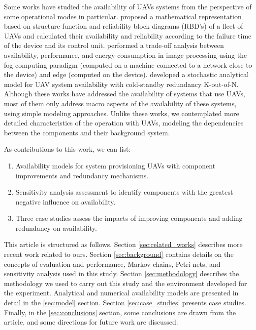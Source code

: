 \documentclass[conference]{IEEEtran}
\begin{document}
Some works have studied the availability of UAVs systems from the perspective of some operational modes in particular. \citet{Zaitseva2020, rusnak2019reliability} proposed a mathematical representation based on structure function and reliability block diagrams (RBD's) of a fleet of UAVs and calculated their availability and reliability according to the failure time of the device and its control unit. \citet{Machida2021, Report} performed a trade-off analysis between availability, performance, and energy consumption in image processing using the fog computing paradigm (computed on a machine connected to a network close to the device) and edge (computed on the device). \citet{Maccarthy2019} developed a stochastic analytical model for UAV system availability with cold-standby redundancy K-out-of-N. Although these works have addressed the availability of systems that use UAVs, most of them only address macro aspects of the availability of these systems, using simple modeling approaches. Unlike these works, we contemplated more detailed characteristics of the operation with UAVs, modeling the dependencies between the components and their background system.

As contributions to this work, we can list:
\begin{enumerate}
     \item Availability models for system provisioning UAVs with component improvements and redundancy mechanisms.
     \item Sensitivity analysis assessment to identify components with the greatest negative influence on availability.
     \item Three case studies assess the impacts of improving components and adding redundancy on availability.
\end{enumerate}

This article is structured as follows. Section \ref{sec:related_works} describes more recent work related to ours. Section \ref{sec:background} contains details on the concepts of evaluation and performance, Markov chains, Petri nets, and sensitivity analysis used in this study. Section \ref{sec:methodology} describes the methodology we used to carry out this study and the environment developed for the experiment. Analytical and numerical availability models are presented in detail in the \ref{sec:model} section. Section \ref{sec:case_studies} presents case studies. Finally, in the \ref{sec:conclusions} section, some conclusions are drawn from the article, and some directions for future work are discussed.
\end{document}
